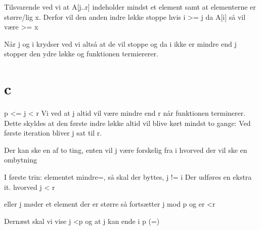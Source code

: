 Tilsvarende ved vi at A[j..r] indeholder mindst et element samt at elementerne er større/lig x. Derfor vil den anden indre løkke stoppe hvis i >= j da A[i] så vil være >= x

Når j og i krydser ved vi altså at de vil stoppe og da i ikke er mindre end j stopper den ydre løkke og funktionen termiererer. 



\section{c}

p <= j < r
Vi ved at j altid vil være mindre end r når funktionen terminerer. Dette skyldes at den første indre løkke altid vil blive kørt mindst to gange: Ved første iteration bliver j sat til r. 




Der kan ske en af to ting, enten vil j være forskelig fra i hvorved der vil ske en ombytning




I første trin:
elementet mindre=, så skal der byttes, j != i
Der udføres en ekstra it. hvorved j < r

eller
j møder et element der er større så fortsætter j mod p og er <r




Dernæst skal vi vise
j <p
og at j kan ende i p (=)










